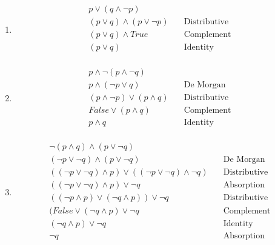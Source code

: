 \documentclass{article}
\begin{document}
\begin{enumerate}[label=\alph*)]
\item
\begin{align*}
p \lor (q \land \neg p)          & \\
(p \lor q) \land (p \lor \neg p) & \quad \text{Distributive} \\
(p \lor q) \land True            & \quad \text{Complement} \\
(p \lor q)                       & \quad \text{Identity} \\
\end{align*}

\item
\begin{align*}
p \land \neg(p \land \neg q)      & \\
p \land (\neg p \lor q)           & \quad \text{De Morgan} \\
(p \land \neg p) \lor (p \land q) & \quad \text{Distributive} \\
False \lor (p \land q)            & \quad \text{Complement} \\
p \land q                         & \quad \text{Identity} \\
\end{align*}

\item
\begin{align*}
\neg(p \land q) \land (p \lor \neg q)                                    & \\
(\neg p \lor \neg q) \land (p \lor \neg q)                               & \quad \text{De Morgan} \\
((\neg p \lor \neg q) \land p) \lor ((\neg p \lor \neg q) \land \neg q)  & \quad \text{Distributive} \\
((\neg p \lor \neg q) \land p) \lor \neg q                               & \quad \text{Absorption} \\
((\neg p \land p) \lor (\neg q \land p)) \lor \neg q                     & \quad \text{Distributive} \\
(False \lor (\neg q \land p) \lor \neg q                                 & \quad \text{Complement} \\
(\neg q \land p) \lor \neg q                                             & \quad \text{Identity} \\
\neg q                                                                   & \quad \text{Absorption} \\
\end{align*}
\end{enumerate}
\end{document}
